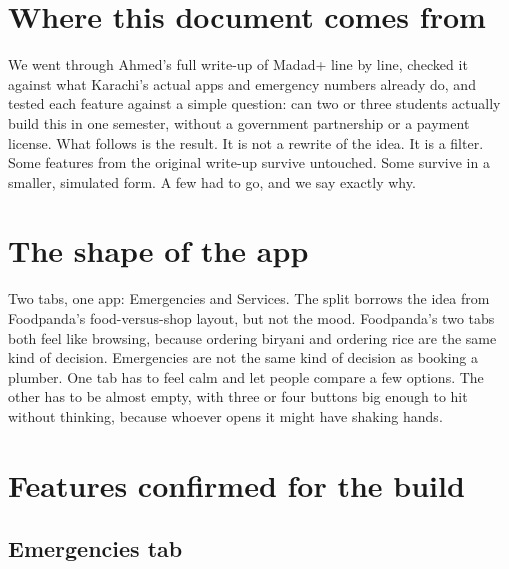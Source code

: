 \documentclass[11pt,a4paper]{article}
\begin{document}
\section*{Where this document comes from}

We went through Ahmed's full write-up of Madad+ line by line, checked it against what Karachi's actual apps and emergency numbers already do, and tested each feature against a simple question: can two or three students actually build this in one semester, without a government partnership or a payment license. What follows is the result. It is not a rewrite of the idea. It is a filter. Some features from the original write-up survive untouched. Some survive in a smaller, simulated form. A few had to go, and we say exactly why.

\section*{The shape of the app}

Two tabs, one app: Emergencies and Services. The split borrows the idea from Foodpanda's food-versus-shop layout, but not the mood. Foodpanda's two tabs both feel like browsing, because ordering biryani and ordering rice are the same kind of decision. Emergencies are not the same kind of decision as booking a plumber. One tab has to feel calm and let people compare a few options. The other has to be almost empty, with three or four buttons big enough to hit without thinking, because whoever opens it might have shaking hands.

\section{Features confirmed for the build}

\subsection{Emergencies tab}
\end{document}
